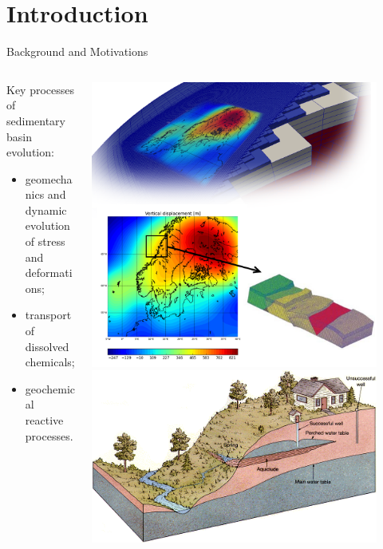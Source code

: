 \documentclass{beamer}
\begin{document}
\section{Introduction}
\begin{frame}{Background and Motivations}
\begin{columns}
\begin{column}{0.65\textwidth}
\begin{block}{Key processes of sedimentary basin evolution:} 
\begin {itemize}
\item  geomechanics and dynamic evolution of stress and deformations; 
\item  transport of dissolved chemicals; 
\item geochemical reactive processes.
\end{itemize}
\end{block}
\end{column}
\begin{column}{0.35\textwidth}
\includegraphics[width=0.9\textwidth]{figure/intro1}
\includegraphics[width=0.9\textwidth]{figure/aquafier}
\end{column}
\end{columns}
\end{frame}
\end{document}
